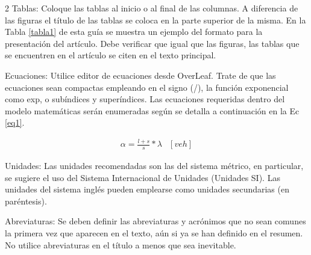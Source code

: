 \documentclass[12pt,twoside,titlepage]{ingenius}
\begin{document}
\begin{multicols}{2}
Tablas: Coloque las tablas al inicio o al final de las columnas. A diferencia de las figuras el título de las tablas se coloca en la parte superior de la misma. 
En la Tabla \ref{tabla1} de esta guía se muestra un ejemplo del formato para la presentación del artículo.
Debe verificar que igual que las figuras, las tablas que se encuentren en el artículo se citen en el texto principal. 

\begin{table}[H]
\centering
{}
  \label{tabla1}%
\end{table}

Ecuaciones: Utilice editor de ecuaciones desde OverLeaf.  Trate de que las ecuaciones sean compactas empleando en el signo (/), la función exponencial como exp, o subíndices y superíndices. Las ecuaciones requeridas dentro del modelo matemáticas serán enumeradas según se detalla a continuación en la Ec \ref{eq1}.

\begin{equation} 
\label{eq1}
\begin{array}{ll}
\alpha = \frac{l + s}{s} * \lambda & [veh]
\end{array}
\end{equation}

Unidades: Las unidades recomendadas son las del sistema métrico, en particular, se sugiere el uso del Sistema Internacional de Unidades (Unidades SI). Las unidades del sistema inglés pueden emplearse como unidades secundarias (en paréntesis). 

Abreviaturas: Se deben definir las abreviaturas y acrónimos que no sean comunes la primera vez que aparecen en el texto, aún si ya se han definido en el resumen. No utilice abreviaturas en el título a menos que sea inevitable.


\end{multicols}
\end{document}
